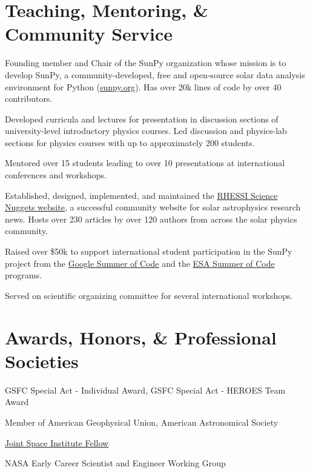\documentclass[11pt]{article}
\begin{document}
\section{Teaching, Mentoring, \& Community Service}
\begin{itemize*}
\item Founding member and Chair of the SunPy organization whose mission is to develop SunPy, a community-developed, free and open-source solar data analysis environment for Python (\url{sunpy.org}). Has over 20k lines of code by over 40 contributors.
\item Developed curricula and lectures for presentation in discussion sections of university-level introductory physics courses. Led discussion and physics-lab sections for physics courses with up to approximately 200 students.
\item Mentored over 15 students leading to over 10 presentations at international conferences and workshops.
\item Established, designed, implemented, and maintained the \href{http://sprg.ssl.berkeley.edu/~tohban/wiki/index.php/RHESSI_Science_Nuggets}{RHESSI Science Nuggets website}, a successful community website for solar astrophysics research news. Hosts over 230 articles by over 120 authors from across the solar physics community.
\item Raised over \$50k to support international student participation in the SunPy project from the \href{https://developers.google.com/open-source/soc/}{Google Summer of Code} and the \href{http://sophia.estec.esa.int/socis2014/}{ESA Summer of Code} programs.
 \item Served on scientific organizing committee for several international workshops.
\end{itemize*}

\section{Awards, Honors, \& Professional Societies}
\begin{itemize*}
\item GSFC Special Act - Individual Award, GSFC Special Act - HEROES Team Award
\item Member of American Geophysical Union, American Astronomical Society
\item \href{https://jsi.astro.umd.edu}{Joint Space Institute Fellow}
\item NASA Early Career Scientist and Engineer Working Group
\end{itemize*}

\nocite{*}


\end{document}
